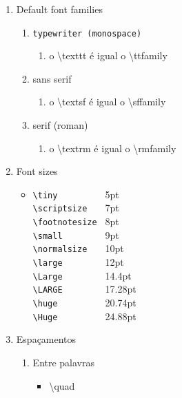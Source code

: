 \documentclass[11pt,a4paper]{article}
\begin{document}
\begin{enumerate}
\begin{enumerate}
		\end{enumerate}
	\item Default font families
		\begin{enumerate}
			\item {\LARGE{\texttt{typewriter (monospace)}}}
			\begin{enumerate}
				\item o \textbackslash texttt é igual o \textbackslash ttfamily
			\end{enumerate}
			\item {\LARGE\textsf{sans serif}}
			\begin{enumerate}
				\item o \textbackslash textsf é igual o \textbackslash sffamily
			\end{enumerate}
			\item {\LARGE\textrm{serif (roman)}}
			\begin{enumerate}
				\item o \textbackslash textrm é igual o \textbackslash rmfamily
			\end{enumerate}
		\end{enumerate}
	\item Font sizes
		\begin{itemize}
			\item{
			\verb=\tiny         =  {\ttfamily \tiny  5pt 	}\\
			\verb=\scriptsize   =  {\ttfamily \scriptsize 7pt 	}\\
			\verb=\footnotesize =  {\ttfamily \footnotesize 8pt		}\\
			\verb=\small        =  {\ttfamily \small 9pt 	}\\
			\verb=\normalsize   =  {\ttfamily \normalsize 10pt	}\\
			\verb=\large        =  {\ttfamily \large 12pt	}\\
			\verb=\Large        =  {\ttfamily \Large 14.4pt 	}\\ 
			\verb=\LARGE        =  {\ttfamily \LARGE 17.28pt	}\\
			\verb=\huge         =  {\ttfamily \huge 20.74pt }\\
			\verb=\Huge         =  {\ttfamily \Huge 24.88pt }\\
			}
		\end{itemize}
	\item Espaçamentos
		\begin{enumerate}
			\item Entre palavras
				\begin{itemize}
					\item \textbackslash quad 
					

\end{itemize}
\end{enumerate}
\end{enumerate}
\end{document}
